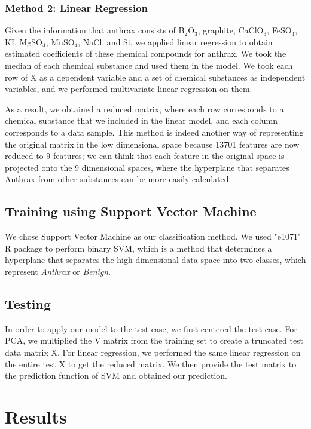 \documentclass[12pt,onecolumn,letterpaper]{article}
\begin{document}
\subsubsection{Method 2: Linear Regression}

Given the information that anthrax consists of B$_{2}$O$_{3}$, graphite, CaClO${_3}$, FeSO${_4}$, KI, MgSO${_4}$, MnSO$_4$, NaCl, and Si, we applied linear regression to obtain estimated coefficients of these chemical compounds for anthrax. We took the median of each chemical substance and used them in the model. We took each row of X as a dependent variable and a set of chemical substances as independent variables, and we performed multivariate linear regression on them. 

As a result, we obtained a reduced matrix, where each row corresponds to a chemical substance that we included in the linear model, and each column corresponds to a data sample. This method is indeed another way of representing the original matrix in the low dimensional space because 13701 features are now reduced to 9 features; we can think that each feature in the original space is projected onto the 9 dimensional spaces, where the hyperplane that separates Anthrax from other substances can be more easily calculated. 

\subsection{Training using Support Vector Machine}

We chose Support Vector Machine as our classification method. We used "e1071" R package to perform binary SVM, which is a method that determines a hyperplane that separates the high dimensional data space into two classes, which represent \textit{Anthrax} or \textit{Benign}. 


\subsection{Testing}

In order to apply our model to the test case, we first centered the test case. For PCA, we multiplied the V matrix from the training set to create a truncated test data matrix X. For linear regression, we performed the same linear regression on the entire test X to get the reduced matrix. We then provide the test matrix to the prediction function of SVM and obtained our prediction. 


\section{Results}
\end{document}
